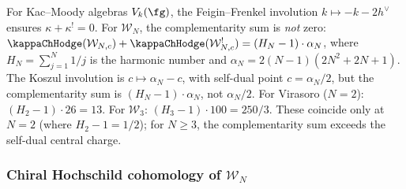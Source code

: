 \begin{remark}
\label{rem:wn-complementarity-nonzero}
%
For Kac--Moody algebras $V_k(\fg)$, the Feigin--Frenkel
involution $k \mapsto -k - 2h^\vee$ ensures
$\kappa + \kappa^! = 0$. For $\mathcal{W}_N$,
the complementarity sum is \emph{not} zero:
$\kappaChHodge(\mathcal{W}_{N,c}) + \kappaChHodge(\mathcal{W}_{N,c}^!)
= (H_N - 1) \cdot \alpha_N$, where $H_N = \sum_{j=1}^N 1/j$
is the harmonic number and $\alpha_N = 2(N{-}1)(2N^2{+}2N{+}1)$.
The Koszul involution is $c \mapsto \alpha_N - c$, with
self-dual point $c = \alpha_N/2$, but the complementarity sum
is $(H_N - 1) \cdot \alpha_N$, not $\alpha_N/2$.
For Virasoro ($N=2$): $(H_2 - 1) \cdot 26 = 13$.
For $\mathcal{W}_3$: $(H_3 - 1) \cdot 100 = 250/3$.
These coincide only at $N=2$ (where $H_2 - 1 = 1/2$);
for $N \geq 3$, the complementarity sum exceeds the
self-dual central charge.
\end{remark}

\subsubsection{Chiral Hochschild cohomology of $\mathcal{W}_N$}
\label{subsubsec:wn-hochschild}

